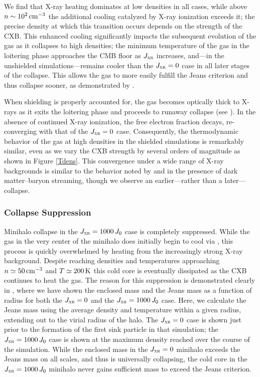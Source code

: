 \documentclass[../thesis.tex]{subfiles}
\begin{document}
We find that X-ray heating dominates at low densities in all cases, while above $n\sim10^2\cc$ the additional cooling catalyzed by X-ray ionization exceeds it; the precise density at which this transition occurs depends on the strength of the CXB.  This enhanced cooling significantly impacts the subsequent evolution of the gas as it collapses to high densities; the minimum temperature of the gas in the loitering phase approaches the CMB floor as $\jxr$ increases, and---in the unshielded simulations---remains cooler than the $\jxr=0$ case in all later stages of the collapse. This allows the gas to more easily fulfill the Jeans criterion and thus collapse sooner, as demonstrated by .

When shielding is properly accounted for, the gas becomes optically thick to X-rays as it exits the loitering phase and proceeds to runaway collapse (see ).  In the absence of continued X-ray ionization, the free electron fraction decays, re-converging with that of the $\jxr=0$ case.  Consequently, the thermodynamic behavior of the gas at high densities in the shielded simulations is remarkably similar, even as we vary the CXB strength by several orders of magnitude as shown in Figure \ref{Tdens}. This convergence under a wide range of X-ray backgrounds is similar to the behavior noted by \citet{StacyBrommLoeb2011a} and \citet{Greifetal2011b} in the presence of dark matter--baryon streaming, though we observe an earlier---rather than a later---collapse.

\subsubsection{Collapse Suppression}
 \label{suppression}
Minihalo collapse in the $\jxr = 1000\,J_0$ case is completely suppressed.  While the gas in the very center of the minihalo does initially begin to cool via \htwo, this process is quickly overwhelmed by heating from the increasingly strong X-ray background.  Despite reaching densities and temperatures approaching $n \simeq 50\cc$ and $T \simeq 200\kelvin$ this cold core is eventually dissipated as the CXB continues to heat the gas. 
The reason for this suppression is demonstrated clearly in , where we have shown the enclosed mass and the Jeans mass as a function of radius for both the $\jxr = 0$ and the $\jxr = 1000\,J_0$ case. Here, we calculate the Jeans mass using the average density and temperature within a given radius, extending out to the virial radius of the halo.  The $\jxr = 0$ case is shown just prior to the formation of the first sink particle in that simulation; the $\jxr = 1000\,J_0$ case is shown at the maximum density reached over the course of the simulation.  While the enclosed mass in the $\jxr = 0$ minihalo exceeds the Jeans mass on all scales, and thus is universally collapsing, the cold core in the $\jxr = 1000\,J_0$ minihalo never gains sufficient mass to exceed the Jeans criterion.
\end{document}
